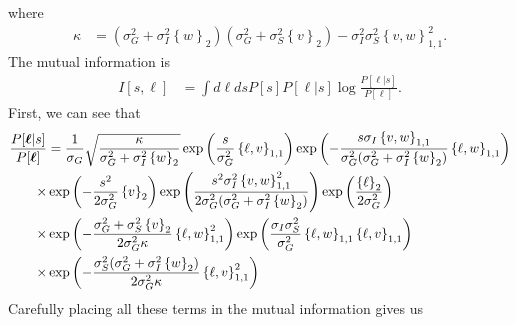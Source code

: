 \documentclass[11pt]{article}
\begin{document}
where 
\begin{align}
	\kappa &= \left(\sigma_G^2 + \sigma_I^2 \left\{w\right\}_2\right)\left(\sigma_G^2 + \sigma_S^2 \left\{v\right\}_2\right) - \sigma_I^2 \sigma_S^2 \left\{v,w\right\}_{1,1}^2.
\end{align}
The mutual information is 
\begin{align}
	I[s,\boldsymbol{\ell}] &= \int d\boldsymbol{\ell} ds P[s] P[\boldsymbol{\ell}|s] \log \frac{P[\boldsymbol{\ell}|s]}{P[\boldsymbol{\ell}]}.
\end{align}
First, we can see that 
\begin{align}
 \frac{P[\boldsymbol{\ell}|s]}{P[\boldsymbol{\ell}]} &= \frac{1}{\sigma_G} \sqrt{\frac{\kappa}{\sigma_G^2 + \sigma_I^2 \left\{w\right\}_2}}\exp\left(\frac{s}{\sigma_G^2} \left\{\ell, v\right\}_{1,1}\right) \exp\left(- \frac{s \sigma_I \left\{v,w\right\}_{1,1}}{ \sigma_G^2 (\sigma_G^2 + \sigma_I^2 \left\{w\right\}_2)} \left\{\ell, w\right\}_{1,1}\right) \notag \\
 \times &\exp\left(-\frac{s^2}{2\sigma_G^2} \left\{v\right\}_2\right) \exp\left(\frac{s^2 \sigma_I^2 \left\{v,w\right\}_{1,1}^2}{2 \sigma_G^2 (\sigma_G^2 + \sigma_I^2 \left\{w\right\}_2)}\right) \exp\left(\frac{\left\{\ell \right\}_2}{2\sigma_G^2}\right)  \notag \\
 \times & \exp\left( -\frac{\sigma_G^2 + \sigma_S^2 \left\{v\right\}_2}{2 \sigma_G^2 \kappa} \left\{\ell, w\right\}_{1,1}^2\right)\exp\left(\frac{\sigma_I \sigma_S^2}{\sigma_G^2} \left\{\ell, w\right\}_{1,1} \left\{\ell, v\right\}_{1,1} \right) \notag \\
 \times & \exp\left(-\frac{\sigma_S^2 (\sigma_G^2 + \sigma_I^2 \left\{w\right\}_2)}{2 \sigma_G^2 \kappa} \left\{\ell, v\right\}_{1,1}^2\right)
\end{align}
Carefully placing all these terms in the mutual information gives us 
\end{document}
